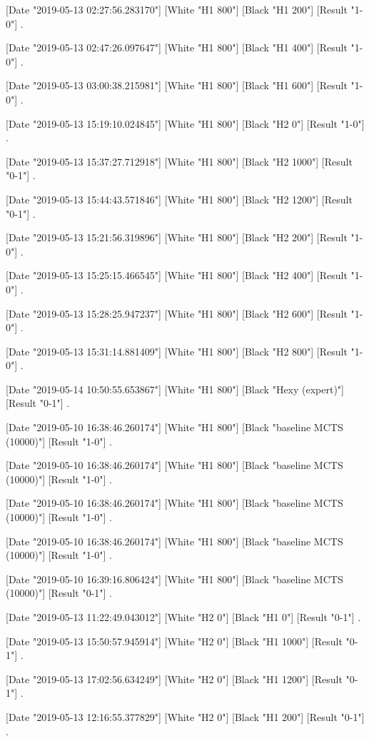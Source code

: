 {[Date "2019-05-13 02:27:56.283170"]
[White "H1 800"]
[Black "H1 200"]
[Result "1-0"]
.

[Date "2019-05-13 02:47:26.097647"]
[White "H1 800"]
[Black "H1 400"]
[Result "1-0"]
.

[Date "2019-05-13 03:00:38.215981"]
[White "H1 800"]
[Black "H1 600"]
[Result "1-0"]
.

[Date "2019-05-13 15:19:10.024845"]
[White "H1 800"]
[Black "H2 0"]
[Result "1-0"]
.

[Date "2019-05-13 15:37:27.712918"]
[White "H1 800"]
[Black "H2 1000"]
[Result "0-1"]
.

[Date "2019-05-13 15:44:43.571846"]
[White "H1 800"]
[Black "H2 1200"]
[Result "0-1"]
.

[Date "2019-05-13 15:21:56.319896"]
[White "H1 800"]
[Black "H2 200"]
[Result "1-0"]
.

[Date "2019-05-13 15:25:15.466545"]
[White "H1 800"]
[Black "H2 400"]
[Result "1-0"]
.

[Date "2019-05-13 15:28:25.947237"]
[White "H1 800"]
[Black "H2 600"]
[Result "1-0"]
.

[Date "2019-05-13 15:31:14.881409"]
[White "H1 800"]
[Black "H2 800"]
[Result "1-0"]
.

[Date "2019-05-14 10:50:55.653867"]
[White "H1 800"]
[Black "Hexy (expert)"]
[Result "0-1"]
.

[Date "2019-05-10 16:38:46.260174"]
[White "H1 800"]
[Black "baseline MCTS (10000)"]
[Result "1-0"]
.

[Date "2019-05-10 16:38:46.260174"]
[White "H1 800"]
[Black "baseline MCTS (10000)"]
[Result "1-0"]
.

[Date "2019-05-10 16:38:46.260174"]
[White "H1 800"]
[Black "baseline MCTS (10000)"]
[Result "1-0"]
.

[Date "2019-05-10 16:38:46.260174"]
[White "H1 800"]
[Black "baseline MCTS (10000)"]
[Result "1-0"]
.

[Date "2019-05-10 16:39:16.806424"]
[White "H1 800"]
[Black "baseline MCTS (10000)"]
[Result "0-1"]
.

[Date "2019-05-13 11:22:49.043012"]
[White "H2 0"]
[Black "H1 0"]
[Result "0-1"]
.

[Date "2019-05-13 15:50:57.945914"]
[White "H2 0"]
[Black "H1 1000"]
[Result "0-1"]
.

[Date "2019-05-13 17:02:56.634249"]
[White "H2 0"]
[Black "H1 1200"]
[Result "0-1"]
.

[Date "2019-05-13 12:16:55.377829"]
[White "H2 0"]
[Black "H1 200"]
[Result "0-1"]
.

}
